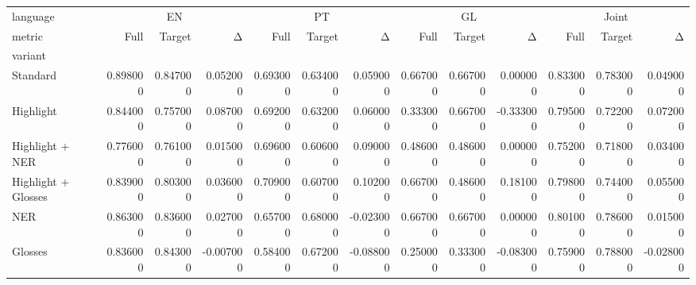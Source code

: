 \begin{tabular}{lrrrrrrrrrrrr}
\toprule
language & \multicolumn{3}{c}{EN} & \multicolumn{3}{c}{PT} & \multicolumn{3}{c}{GL} & \multicolumn{3}{c}{Joint} \\
metric & Full & Target & Δ & Full & Target & Δ & Full & Target & Δ & Full & Target & Δ \\
variant &  &  &  &  &  &  &  &  &  &  &  &  \\
\midrule
Standard & 0.898000 & 0.847000 & 0.052000 & 0.693000 & 0.634000 & 0.059000 & 0.667000 & 0.667000 & 0.000000 & 0.833000 & 0.783000 & 0.049000 \\
Highlight & 0.844000 & 0.757000 & 0.087000 & 0.692000 & 0.632000 & 0.060000 & 0.333000 & 0.667000 & -0.333000 & 0.795000 & 0.722000 & 0.072000 \\
Highlight + NER & 0.776000 & 0.761000 & 0.015000 & 0.696000 & 0.606000 & 0.090000 & 0.486000 & 0.486000 & 0.000000 & 0.752000 & 0.718000 & 0.034000 \\
Highlight + Glosses & 0.839000 & 0.803000 & 0.036000 & 0.709000 & 0.607000 & 0.102000 & 0.667000 & 0.486000 & 0.181000 & 0.798000 & 0.744000 & 0.055000 \\
NER & 0.863000 & 0.836000 & 0.027000 & 0.657000 & 0.680000 & -0.023000 & 0.667000 & 0.667000 & 0.000000 & 0.801000 & 0.786000 & 0.015000 \\
Glosses & 0.836000 & 0.843000 & -0.007000 & 0.584000 & 0.672000 & -0.088000 & 0.250000 & 0.333000 & -0.083000 & 0.759000 & 0.788000 & -0.028000 \\
\bottomrule
\end{tabular}
